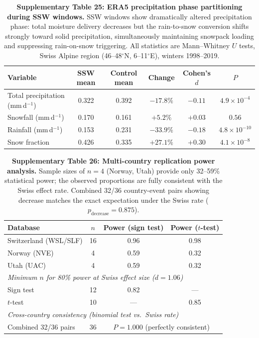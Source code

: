 \begin{table}[!ht]
\centering
\caption{\textbf{Supplementary Table 25: ERA5 precipitation phase partitioning during SSW windows.}
SSW windows show dramatically altered precipitation phase: total moisture delivery decreases but the rain-to-snow conversion shifts strongly toward solid precipitation, simultaneously maintaining snowpack loading and suppressing rain-on-snow triggering. All statistics are Mann--Whitney $U$ tests, Swiss Alpine region (46--48$^\circ$N, 6--11$^\circ$E), winters 1998--2019.}
\label{tab:precip_phase}
\small
\begin{tabular}{lccccc}
\toprule
Variable & SSW mean & Control mean & Change & Cohen's $d$ & $P$ \\
\midrule
Total precipitation (mm\,d$^{-1}$) & 0.322 & 0.392 & $-17.8\%$ & $-0.11$ & $4.9 \times 10^{-4}$ \\
Snowfall (mm\,d$^{-1}$) & 0.170 & 0.161 & $+5.2\%$ & $+0.03$ & $0.56$ \\
Rainfall (mm\,d$^{-1}$) & 0.153 & 0.231 & $-33.9\%$ & $-0.18$ & $4.8 \times 10^{-10}$ \\
Snow fraction & 0.426 & 0.335 & $+27.1\%$ & $+0.30$ & $4.1 \times 10^{-8}$ \\
\bottomrule
\end{tabular}
\end{table}

\begin{table}[!ht]
\centering
\caption{\textbf{Supplementary Table 26: Multi-country replication power analysis.}
Sample sizes of $n = 4$ (Norway, Utah) provide only 32--59\% statistical power; the observed proportions are fully consistent with the Swiss effect rate. Combined 32/36 country-event pairs showing decrease matches the exact expectation under the Swiss rate ($p_{\mathrm{decrease}} = 0.875$).}
\label{tab:power}
\small
\begin{tabular}{lccc}
\toprule
Database & $n$ & Power (sign test) & Power ($t$-test) \\
\midrule
Switzerland (WSL/SLF) & 16 & 0.96 & 0.98 \\
Norway (NVE) & 4 & 0.59 & 0.32 \\
Utah (UAC) & 4 & 0.59 & 0.32 \\
\midrule
\multicolumn{4}{l}{\textit{Minimum $n$ for 80\% power at Swiss effect size ($d = 1.06$)}} \\
Sign test & 12 & 0.82 & --- \\
$t$-test & 10 & --- & 0.85 \\
\midrule
\multicolumn{4}{l}{\textit{Cross-country consistency (binomial test vs.\ Swiss rate)}} \\
Combined 32/36 pairs & 36 & \multicolumn{2}{c}{$P = 1.000$ (perfectly consistent)} \\
\bottomrule
\end{tabular}
\end{table}

